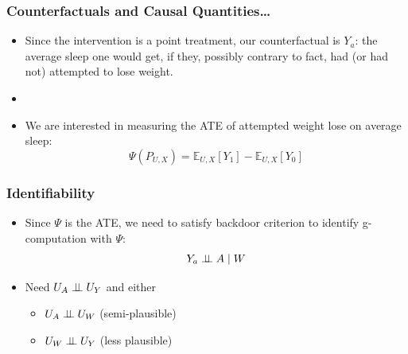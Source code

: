 \documentclass{beamer}
\newcommand{\E}{\mathbb{E}}
\newcommand{\indp}{\ensuremath{\perp\hspace{-5pt}\perp}}
\begin{document}
\begin{frame}
 \frametitle{Counterfactuals and Causal Quantities\ldots}
  \begin{itemize}
    \item  Since the intervention is a point treatment, our counterfactual is $Y_{a}$: the average sleep one would get, if they, possibly contrary to fact, had (or had not) attempted to lose weight.
    \item[]
    \item  We are interested in measuring the ATE of attempted weight lose on average sleep:
    \[
      \Psi(P_{U,X}) = \E_{U,X}[Y_1] - \E_{U,X}[Y_0]
    \]
  \end{itemize}
 \end{frame}

\begin{frame}
 \frametitle{Identifiability}
\begin{minipage}{0.45\linewidth}
 \begin{itemize}
   \item Since $\Psi$ is the ATE, we need to satisfy backdoor criterion to identify g-computation with $\Psi$:
   \[
   Y_{a} \indp A \mid W
   \]
   \item Need $U_{A} \indp U_{Y}$ and either
    \begin{itemize}
      \item $U_{A} \indp U_{W}$  (semi-plausible)
      \item $U_{W} \indp U_{Y}$  (less plausible)
    \end{itemize}
 \end{itemize}
\end{minipage}
\begin{minipage}{0.45\linewidth}
\end{minipage}
\end{frame}
\end{document}
